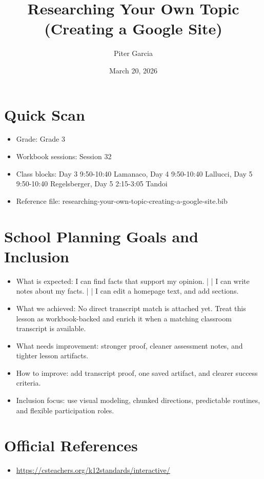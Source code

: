 \documentclass[11pt]{article}
\title{Researching Your Own Topic (Creating a Google Site)}
\author{Piter Garcia}
\date{March 20, 2026}
\begin{document}
\maketitle
\section*{Quick Scan}
\begin{itemize}[leftmargin=*]
\item Grade: Grade 3
\item Workbook sessions: Session 32
\item Class blocks: Day 3 9:50-10:40 Lamanaco, Day 4 9:50-10:40 Lallucci, Day 5 9:50-10:40 Regelsberger, Day 5 2:15-3:05 Tandoi
\item Reference file: researching-your-own-topic-creating-a-google-site.bib
\end{itemize}
\section*{School Planning Goals and Inclusion}
\begin{itemize}[leftmargin=*]
\item What is expected: I can find facts that support my opinion. | | I can write notes about my facts. | | I can edit a homepage text, and add sections.
\item What we achieved: No direct transcript match is attached yet. Treat this lesson as workbook-backed and enrich it when a matching classroom transcript is available.
\item What needs improvement: stronger proof, cleaner assessment notes, and tighter lesson artifacts.
\item How to improve: add transcript proof, one saved artifact, and clearer success criteria.
\item Inclusion focus: use visual modeling, chunked directions, predictable routines, and flexible participation roles.
\end{itemize}
\section*{Official References}
\begin{itemize}[leftmargin=*]
\item \url{https://csteachers.org/k12standards/interactive/}

\end{itemize}
\end{document}
